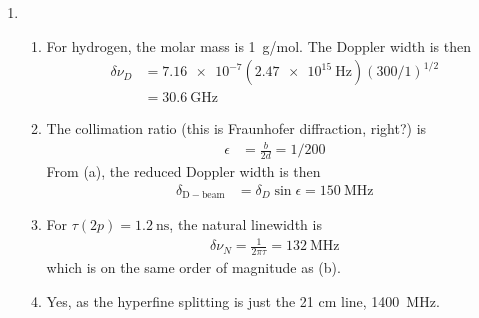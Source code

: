 \documentclass{homework}
\begin{document}
\begin{enumerate}
\begin{enumerate}
			\item From the problem, the angular distribution is \begin{align*}
				I(\theta) & = I_0 \sin[2](\theta)
				\intertext{Integrating this,}
				W & = 2\pi W_0 \int \sin[2](\theta) \dd{\theta} \\
					& = \pi^2 W_0 \\
				W_0 & = W_\mathrm{total} / \pi^2
			\end{align*}
		\end{enumerate}
	
		\item[2.] \begin{enumerate}
			\item For hydrogen, the molar mass is \SI{1}{\g/\mol}. The Doppler width is then \begin{align*}
				\delta \nu_D & = \num{7.16e-7} \left(\SI{2.47e15}{\Hz}\right) \left(300 / 1\right)^{1/2} \\
				& = \SI{30.6}{\GHz}
			\end{align*}
		
			\item The collimation ratio (this is Fraunhofer diffraction, right?) is \begin{align*}
				\epsilon & = \frac{b}{2d} = 1 / 200
			\end{align*}
			From (a), the reduced Doppler width is then \begin{align*}
				\delta_\mathrm{D-beam} & = \delta_D \sin \epsilon = \SI{150}{\MHz}
			\end{align*}
			
			\item For $\tau(2p) = \SI{1.2}{\ns}$, the natural linewidth is \begin{align*}
				\delta \nu_N = \frac{1}{2 \pi \tau} = \SI{132}{\MHz}
			\end{align*}
			which is on the same order of magnitude as (b).
			
			\item Yes, as the hyperfine splitting is just the 21 cm line, \SI{1400}{\MHz}.
		\end{enumerate}
	

\end{enumerate}
\end{document}
